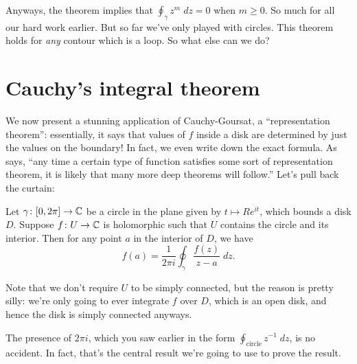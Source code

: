 Anyways, the theorem implies that $\oint_\gamma z^m \; dz = 0$ when $m \ge 0$.
So much for all our hard work earlier.
But so far we've only played with circles.
This theorem holds for \emph{any} contour which is a loop.
So what else can we do?

\section{Cauchy's integral theorem}
We now present a stunning application of Cauchy-Goursat, a ``representation theorem'':
essentially, it says that values of $f$ inside a disk
are determined by just the values on the boundary!
In fact, we even write down the exact formula.
As \cite{ref:dartmouth} says,
``any time a certain type of function satisfies some sort of representation theorem,
it is likely that many more deep theorems will follow.''
Let's pull back the curtain:

\begin{theorem}
	Let $\gamma \colon [0,2\pi] \to \mathbb C$ be a circle in the plane given by $t \mapsto Re^{it}$,
	which bounds a disk $D$.
	Suppose $f \colon U \to \mathbb C$ is holomorphic such that $U$ contains the circle and its interior.
	Then for any point $a$ in the interior of $D$, we have
	\[
		f(a)
		=
		\frac{1}{2\pi i} \oint_\gamma \frac{f(z)}{z-a} \; dz.
	\]
\end{theorem}
Note that we don't require $U$ to be simply connected, but the reason is pretty silly:
we're only going to ever integrate $f$ over $D$, which is an open disk, and hence the disk
is simply connected anyways.

The presence of $2\pi i$, which you saw earlier in the form $\oint_{\text{circle}} z^{-1} \; dz$,
is no accident.
In fact, that's the central result we're going to use to prove the result.

